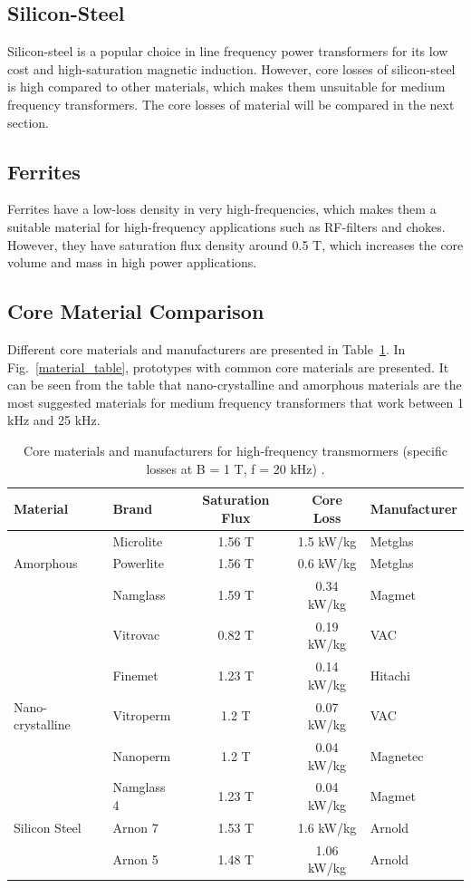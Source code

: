 \documentclass[a4paper, 11pt]{article} %
\begin{document}
\subsection*{Silicon-Steel}

Silicon-steel is a popular choice in line frequency power transformers for its low cost and high-saturation magnetic induction. However, core losses of silicon-steel is high compared to other materials, which makes them unsuitable for medium frequency transformers. The core losses of material will be compared in the next section.

\subsection*{Ferrites}

Ferrites have a low-loss density in very high-frequencies, which makes them a suitable material for high-frequency applications such as RF-filters and chokes. However, they have saturation flux density around 0.5 T, which increases the core volume and mass in high power applications. 

\subsection*{Core Material Comparison}

Different core materials and manufacturers are presented in Table~\ref{core-loss-table}. In Fig.~\ref{material_table}, prototypes with common core materials are presented. It can be seen from the table that nano-crystalline and amorphous materials are the most suggested materials for medium frequency transformers that work between 1 kHz and 25 kHz.


\begin{table}[]
\begin{center}
\begin{tabular}{llccl}
 Material & Brand & Saturation Flux & Core Loss & Manufacturer \\ 
 \hline
& Microlite & 1.56 T & 1.5 kW/kg & Metglas\\
Amorphous & Powerlite & 1.56 T & 0.6 kW/kg & Metglas\\
& Namglass & 1.59 T & 0.34 kW/kg & Magmet\\
& Vitrovac & 0.82 T & 0.19 kW/kg & VAC\\
\hline
& Finemet & 1.23 T & 0.14 kW/kg & Hitachi\\
Nano-crystalline& Vitroperm & 1.2 T & 0.07 kW/kg & VAC\\
& Nanoperm & 1.2 T & 0.04 kW/kg & Magnetec\\
& Namglass 4 & 1.23 T & 0.04 kW/kg & Magmet\\
\hline
Silicon Steel & Arnon 7 & 1.53 T & 1.6 kW/kg & Arnold\\
& Arnon 5 & 1.48 T & 1.06 kW/kg & Arnold\\
\hline
\end{tabular} 
\end{center}
\caption{Core materials and manufacturers for high-frequency transmormers (specific losses at B = 1 T, f = 20 kHz) \cite{Ortiz2010}.}
\label{core-loss-table}
\end{table}
\end{document}
